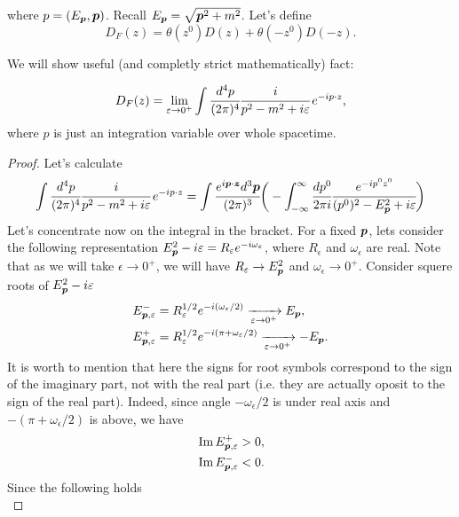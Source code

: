 \documentclass[main.tex]{subfiles}
\begin{document}
where $p = (E_{\bs{p}}, \bs{p})$. Recall $E_{\bs{p}} = \sqrt{\bs{p}^2 + m^2}$.
Let's define 
\begin{equation}
D_F(z) = \theta(z^0)D(z) + \theta(-z^0)D(-z).
\end{equation}

We will show useful (and completly strict mathematically) fact:
\begin{fact}
\begin{equation}
D_F(z) = \lim_{\epsilon\to 0^+}\int \cfrac{d^4 p}{(2\pi)^4} \cfrac{i}{p^2 - m^2 + i\epsilon}\, e^{-ip\cdot z}, 
\end{equation}
where $p$ is just an integration variable over whole spacetime.
\end{fact}
\begin{proof}
Let's calculate
\begin{align}
\label{faynman-propagator-big-integral}
\int \cfrac{d^4 p}{(2\pi)^4} \cfrac{i}{p^2 - m^2 + i\epsilon}\, e^{-ip\cdot z}
= \int \cfrac{e^{i\bs{p}\cdot\bs{z}}d^3 \bs{p}}{(2\pi)^3}
\bigg(-\int_{-\infty}^\infty \cfrac{dp^0}{2\pi i} \cfrac{e^{-ip^0z^0}}{(p^0)^2 - E^2_{\bs{p}} + i\epsilon}\bigg)
\end{align}
Let's concentrate now on the integral in the bracket.
For a fixed $\bs{p}$, lets consider the following representation $E^2_{\bs{p}} - i\epsilon = R_\epsilon e^{-i \omega_\epsilon}$, where $R_\epsilon$ and $\omega_\epsilon$ are real. Note that as we will take $\epsilon \to 0^+$, we will have $R_\epsilon\to E^2_{\bs{p}}$ and $\omega_\epsilon \to 0^+$. Consider squere roots of $E^2_{\bs{p}} - i\epsilon$
\begin{align}
& E^{-}_{\bs{p}, \epsilon} = R^{1/2}_\epsilon e^{-i (\omega_\epsilon/2)} \xrightarrow[\epsilon \to 0^+]{} E_{\bs{p}},\\
& E^{+}_{\bs{p}, \epsilon} = R^{1/2}_\epsilon e^{-i (\pi + \omega_\epsilon/2)}
\xrightarrow[\epsilon \to 0^+]{} - E_{\bs{p}}.
\end{align}
It is worth to mention that here the signs for root symbols correspond to the sign of the imaginary part, not with the real part (i.e. they are actually oposit to the sign of the real part). Indeed, since angle $-\omega_\epsilon/2$ is under real axis and $-(\pi + \omega_\epsilon/2)$ is above, we have
\begin{align}
& \Im E^{+}_{\bs{p}, \epsilon} > 0, \\
& \Im E^{-}_{\bs{p},  \epsilon} < 0.
\end{align}
Since the following holds
\begin{equation}

\end{equation}
\end{proof}
\end{document}
